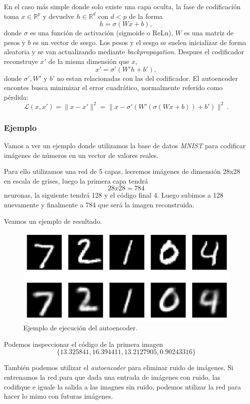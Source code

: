 \documentclass[
  a4paper,
  12pt,
  spanish,
]{scrartcl}
\theoremstyle{teorema-style}
\begin{document}
En el caso más simple donde solo existe una capa oculta, la fase de codificación
toma $x \in \mathbb{R}^p$ y devuelve $h \in \mathbb{R}^d$ con $d < p$ de la
forma
\[
h = \sigma (Wx+b),
\]
donde $\sigma$ es una función de activación (sigmoide o ReLu), $W$ es una matriz
de pesos y $b$ es un vector de sesgo. Los pesos y el sesgo se suelen inicializar
de forma aleatoria y se van actualizando mediante \textit{backpropagation}.
Despues el codificador reconstruye $x'$ de la misma dimensión que $x$,
\[
x' = \sigma' (W'h + b'),
\]
donde $\sigma', W'$ y $b'$ no estan relacionadas con las del codificador. El autoencoder encontes busca minimizar el error cuadrático, normalmente
referido como pérdida:
\[
\mathcal{L}(x,x') = \|x-x'\|^2 = \|x - \sigma'(W'(\sigma(Wx + b))+b')\|^2\,.
\]

\subsubsection{Ejemplo}

Vamos a ver un ejemplo donde utilizamos la base de datos \textit{MNIST} para
codificar imágenes de números en un vector de valores reales.

Para ello utilizamos una red de 5 capas, leeremos imágenes de dimensión 28x28 en
escala de grises, luego la primera capa tendrá $$28x28=784$$ neuronas, la
siguiente tendrá 128 y el código final 4. Luego subimos a 128 nuevamente y
finalmente a 784 que será la imagen reconstruida.

Veamos un ejemplo de resultado.
\begin{figure}[h]
  \centering
  \includegraphics[width=.8\textwidth]{img/autoencoder_ex1}
  \caption{Ejemplo de ejecución del autoencoder.}
  \label{fig:autoencoder_ex1}
\end{figure}

Podemos inspeccionar el código de la primera imagen
$$\{13.325841  , 16.394411  , 13.2127905 ,  0.90243316\}$$

También podemos utilizar el \textit{autoencoder} para eliminar ruido de
imágenes. Si entrenamos la red para que dada una entrada de imágenes con ruido,
las codifique e iguale la salida a las imagnes sin ruido, podemos utilizar la
red para hacer lo mimo con futuras imágenes.
\end{document}
